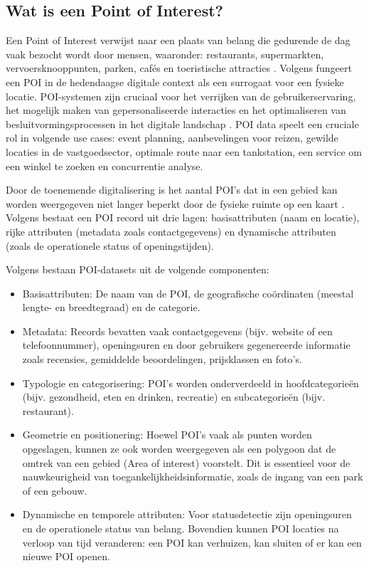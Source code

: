 \subsection{Wat is een Point of Interest?}
Een Point of Interest verwijst naar een plaats van belang die gedurende de dag vaak bezocht wordt door mensen, waaronder: restaurants, supermarkten, vervoersknooppunten, parken, cafés en toeristische attracties \autocite{Yeow2021}. Volgens \textcite{Psyllidis2022} fungeert een POI in de hedendaagse digitale context als een surrogaat voor een fysieke locatie. POI-systemen zijn cruciaal voor het verrijken van de gebruikerservaring, het mogelijk maken van gepersonaliseerde interacties en het optimaliseren van besluitvormingsprocessen in het digitale landschap \autocite{Zhang2025}. POI data speelt een cruciale rol in volgende use cases: event planning, aanbevelingen voor reizen, gewilde locaties in de vastgoedsector, optimale route naar een tankstation, een service om een winkel te zoeken en concurrentie analyse. 

Door de toenemende digitalisering is het aantal POI's dat in een gebied kan worden weergegeven niet langer beperkt door de fysieke ruimte op een kaart \autocite{Psyllidis2022}. Volgens \textcite{Anishma2025b} bestaat een POI record uit drie lagen: basisattributen (naam en locatie), rijke attributen (metadata zoals contactgegevens) en dynamische attributen (zoals de operationele status of openingstijden). 

Volgens \textcite{Psyllidis2022} bestaan POI-datasets uit de volgende componenten:

\begin{itemize}
    \item Basisattributen: De naam van de POI, de geografische coördinaten (meestal lengte- en breedtegraad) en de categorie.
    
    \item Metadata: Records bevatten vaak contactgegevens (bijv. website of een telefoonnummer), openingsuren en door gebruikers gegenereerde informatie zoals recensies, gemiddelde beoordelingen, prijsklassen en foto's.
    
    \item Typologie en categorisering: POI's worden onderverdeeld in hoofdcategorieën (bijv. gezondheid, eten en drinken, recreatie) en subcategorieën (bijv. restaurant). 
    
    \item Geometrie en positionering: Hoewel POI's vaak als punten worden opgeslagen, kunnen ze ook worden weergegeven als een polygoon dat de omtrek van een gebied (Area of interest) voorstelt. Dit is essentieel voor de nauwkeurigheid van toegankelijkheidsinformatie, zoals de ingang van een park of een gebouw.
    
    \item Dynamische en temporele attributen: Voor statusdetectie zijn openingsuren en de operationele status van belang. Bovendien kunnen POI locaties na verloop van tijd veranderen: een POI kan verhuizen, kan sluiten of er kan een nieuwe POI openen.
\end{itemize}


